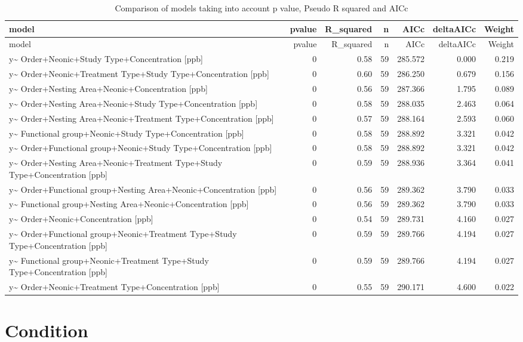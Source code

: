\documentclass[]{elsarticle} %
\begin{document}
\begin{longtable}[c]{@{}lrrrrrr@{}}
\caption{Comparison of models taking into account p value, Pseudo R
squared and AICc}\tabularnewline
\toprule
model & pvalue & R\_squared & n & AICc & deltaAICc &
Weight\tabularnewline
\midrule
\endfirsthead
\toprule
model & pvalue & R\_squared & n & AICc & deltaAICc &
Weight\tabularnewline
\midrule
\endhead
y\textasciitilde{} Order+Neonic+Study Type+Concentration {[}ppb{]} & 0 &
0.58 & 59 & 285.572 & 0.000 & 0.219\tabularnewline
y\textasciitilde{} Order+Neonic+Treatment Type+Study Type+Concentration
{[}ppb{]} & 0 & 0.60 & 59 & 286.250 & 0.679 & 0.156\tabularnewline
y\textasciitilde{} Order+Nesting Area+Neonic+Concentration {[}ppb{]} & 0
& 0.56 & 59 & 287.366 & 1.795 & 0.089\tabularnewline
y\textasciitilde{} Order+Nesting Area+Neonic+Study Type+Concentration
{[}ppb{]} & 0 & 0.58 & 59 & 288.035 & 2.463 & 0.064\tabularnewline
y\textasciitilde{} Order+Nesting Area+Neonic+Treatment
Type+Concentration {[}ppb{]} & 0 & 0.57 & 59 & 288.164 & 2.593 &
0.060\tabularnewline
y\textasciitilde{} Functional group+Neonic+Study Type+Concentration
{[}ppb{]} & 0 & 0.58 & 59 & 288.892 & 3.321 & 0.042\tabularnewline
y\textasciitilde{} Order+Functional group+Neonic+Study
Type+Concentration {[}ppb{]} & 0 & 0.58 & 59 & 288.892 & 3.321 &
0.042\tabularnewline
y\textasciitilde{} Order+Nesting Area+Neonic+Treatment Type+Study
Type+Concentration {[}ppb{]} & 0 & 0.59 & 59 & 288.936 & 3.364 &
0.041\tabularnewline
y\textasciitilde{} Order+Functional group+Nesting
Area+Neonic+Concentration {[}ppb{]} & 0 & 0.56 & 59 & 289.362 & 3.790 &
0.033\tabularnewline
y\textasciitilde{} Functional group+Nesting Area+Neonic+Concentration
{[}ppb{]} & 0 & 0.56 & 59 & 289.362 & 3.790 & 0.033\tabularnewline
y\textasciitilde{} Order+Neonic+Concentration {[}ppb{]} & 0 & 0.54 & 59
& 289.731 & 4.160 & 0.027\tabularnewline
y\textasciitilde{} Order+Functional group+Neonic+Treatment Type+Study
Type+Concentration {[}ppb{]} & 0 & 0.59 & 59 & 289.766 & 4.194 &
0.027\tabularnewline
y\textasciitilde{} Functional group+Neonic+Treatment Type+Study
Type+Concentration {[}ppb{]} & 0 & 0.59 & 59 & 289.766 & 4.194 &
0.027\tabularnewline
y\textasciitilde{} Order+Neonic+Treatment Type+Concentration {[}ppb{]} &
0 & 0.55 & 59 & 290.171 & 4.600 & 0.022\tabularnewline
\bottomrule
\end{longtable}

\section{Condition}\label{condition}
\end{document}
